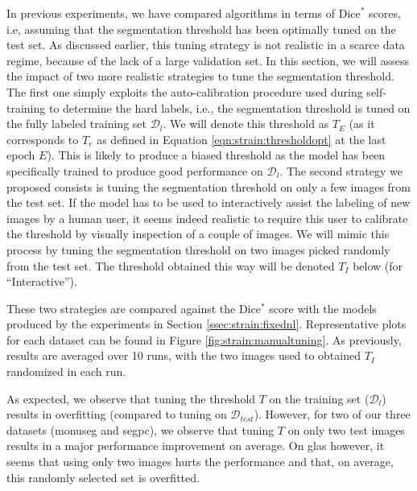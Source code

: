 In previous experiments, we have compared algorithms in terms of $\text{Dice}^*$ scores, i.e, assuming that the segmentation threshold has been optimally tuned on the test set. As discussed earlier, this tuning strategy is not realistic in a scarce data regime, because of the lack of a large validation set. In this section, we will assess the impact of two more realistic strategies to tune the segmentation threshold. The first one simply exploits the auto-calibration procedure used during self-training to determine the hard labels, i.e., the segmentation threshold is tuned on the fully labeled training set $\mathcal{D}_l$. We will denote this threshold as $T_E$ (as it corresponds to $T_e$ as defined in Equation \ref{eqn:strain:thresholdopt} at the last epoch $E$). This is likely to produce a biased threshold as the model has been specifically trained to produce good performance on $\mathcal{D}_l$. The second strategy we proposed consists is tuning the segmentation threshold on only a few images from the test set. If the model has to be used to interactively assist the labeling of new images by a human user, it seems indeed realistic to require this user to calibrate the threshold by visually inspection of a couple of images. We will mimic this process by tuning the segmentation threshold on two images picked randomly from the test set. The threshold obtained this way will be denoted $T_I$ below (for ``Interactive'').

These two strategies are compared against the Dice$^*$ score with the models produced by the experiments in Section \ref{ssec:strain:fixednl}. Representative plots for each dataset can be found in Figure \ref{fig:strain:manualtuning}. As previously, results are averaged over 10 runs, with the two images used to obtained $T_I$ randomized in each run.

As expected, we observe that tuning the threshold $T$ on the training set ($\mathcal{D}_l$) results in overfitting (\ie compared to tuning on $\mathcal{D}_{test}$). However, for two of our three datasets (\acrshort{monuseg} and \acrshort{segpc}), we observe that tuning $T$ on only two test images results in a major performance improvement on average. On \acrshort{glas} however, it seems that using only two images hurts the performance and that, on average, this randomly selected set is overfitted. 

